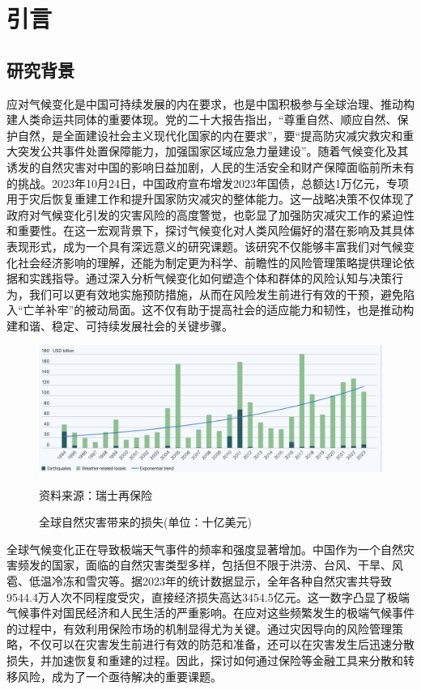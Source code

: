 \chapter{引言}
\section{研究背景}
应对气候变化是中国可持续发展的内在要求，也是中国积极参与全球治理、推动构建人类命运共同体的重要体现。党的二十大报告指出，“尊重自然、顺应自然、保护自然，是全面建设社会主义现代化国家的内在要求”，要“提高防灾减灾救灾和重大突发公共事件处置保障能力，加强国家区域应急力量建设”。随着气候变化及其诱发的自然灾害对中国的影响日益加剧，人民的生活安全和财产保障面临前所未有的挑战。2023年10月24日，中国政府宣布增发2023年国债，总额达1万亿元，专项用于灾后恢复重建工作和提升国家防灾减灾的整体能力。这一战略决策不仅体现了政府对气候变化引发的灾害风险的高度警觉，也彰显了加强防灾减灾工作的紧迫性和重要性。在这一宏观背景下，探讨气候变化对人类风险偏好的潜在影响及其具体表现形式，成为一个具有深远意义的研究课题。该研究不仅能够丰富我们对气候变化社会经济影响的理解，还能为制定更为科学、前瞻性的风险管理策略提供理论依据和实践指导。通过深入分析气候变化如何塑造个体和群体的风险认知与决策行为，我们可以更有效地实施预防措施，从而在风险发生前进行有效的干预，避免陷入“亡羊补牢”的被动局面。这不仅有助于提高社会的适应能力和韧性，也是推动构建和谐、稳定、可持续发展社会的关键步骤。
\begin{figure}[H]
    \includegraphics[width=\linewidth]{img/disaster.png}
    \caption{全球自然灾害带来的损失(单位：十亿美元)}
    资料来源：瑞士再保险
\end{figure}
全球气候变化正在导致极端天气事件的频率和强度显著增加\citep{袁宇锋翟盘茂2022全球变暖与城市效应共同作用下的极端天气气候事件变化的最新认知}。中国作为一个自然灾害频发的国家，面临的自然灾害类型多样，包括但不限于洪涝、台风、干旱、风雹、低温冷冻和雪灾等。据2023年的统计数据显示，全年各种自然灾害共导致9544.4万人次不同程度受灾，直接经济损失高达3454.5亿元。这一数字凸显了极端气候事件对国民经济和人民生活的严重影响。在应对这些频繁发生的极端气候事件的过程中，有效利用保险市场的机制显得尤为关键。通过灾因导向的风险管理策略，不仅可以在灾害发生前进行有效的防范和准备，还可以在灾害发生后迅速分散损失，并加速恢复和重建的过程。因此，探讨如何通过保险等金融工具来分散和转移风险，成为了一个亟待解决的重要课题。

